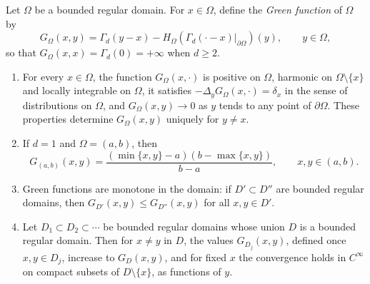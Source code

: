 \begin{theorem}\label{thm:dirichlet-green}
Let $\Omega$ be a bounded regular domain. For $x\in\Omega$, define the \emph{Green function} of $\Omega$ by
\[
 G_\Omega(x,y)=\Gamma_d(y-x)-H_\Omega(\Gamma_d(\cdot-x)|_{\partial\Omega})(y),\qquad y\in\Omega,
\]
so that $G_\Omega(x,x)=\Gamma_d(0)=+\infty$ when $d\geq2$.
\begin{enumerate}
\item For every $x\in\Omega$, the function $G_\Omega(x,\cdot)$ is positive on $\Omega$, harmonic on $\Omega\setminus\{x\}$ and locally integrable on $\Omega$, it satisfies $-\Delta_yG_\Omega(x,\cdot)=\delta_x$ in the sense of distributions on $\Omega$, and $G_\Omega(x,y)\to0$ as $y$ tends to any point of $\partial\Omega$. These properties determine $G_\Omega(x,y)$ uniquely for $y\neq x$.
\item If $d=1$ and $\Omega=(a,b)$, then
\[
 G_{(a,b)}(x,y)=\frac{(\min\{x,y\}-a)(b-\max\{x,y\})}{b-a},\qquad x,y\in(a,b).
\]
\item Green functions are monotone in the domain: if $D'\subset D''$ are bounded regular domains, then $G_{D'}(x,y)\leq G_{D''}(x,y)$ for all $x,y\in D'$.
\item Let $D_1\subset D_2\subset\cdots$ be bounded regular domains whose union $D$ is a bounded regular domain. Then for $x\neq y$ in $D$, the values $G_{D_j}(x,y)$, defined once $x,y\in D_j$, increase to $G_D(x,y)$, and for fixed $x$ the convergence holds in $C^\infty$ on compact subsets of $D\setminus\{x\}$, as functions of $y$.
\end{enumerate}
\end{theorem}
